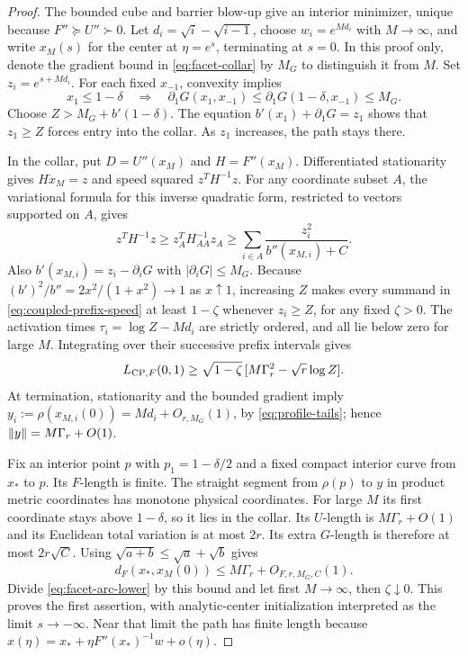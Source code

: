 \begin{proof}
The bounded cube and barrier blow-up give an interior minimizer,
unique because $F''\succeq U''\succ0$. Let
$d_i=\sqrt i-\sqrt{i-1}$, choose $w_i=e^{Md_i}$ with
$M\to\infty$, and write $x_M(s)$ for the center at $\eta=e^s$,
terminating at $s=0$. In this proof only, denote the gradient bound
in \eqref{eq:facet-collar} by $M_G$ to distinguish it from $M$.
Set $z_i=e^{s+Md_i}$. For each fixed $x_{-1}$, convexity implies
\[
 x_1\leq1-\delta\quad\Longrightarrow\quad
 \partial_1G(x_1,x_{-1})\leq
 \partial_1G(1-\delta,x_{-1})\leq M_G.
\]
Choose $Z>M_G+b'(1-\delta)$. The equation
$b'(x_1)+\partial_1G=z_1$ shows that $z_1\geq Z$ forces entry
into the collar. As $z_1$ increases, the path stays there.

In the collar, put $D=U''(x_M)$ and $H=F''(x_M)$.
Differentiated stationarity gives $H\dot x_M=z$ and speed squared
$z^TH^{-1}z$. For any coordinate subset $A$, the variational
formula for this inverse quadratic form, restricted to vectors
supported on $A$, gives
\begin{equation}
 z^TH^{-1}z\geq z_A^TH_{AA}^{-1}z_A
 \geq\sum_{i\in A}\frac{z_i^2}{b''(x_{M,i})+C}.
 \label{eq:coupled-prefix-speed}
\end{equation}
Also $b'(x_{M,i})=z_i-\partial_iG$ with
$|\partial_iG|\leq M_G$. Because
$(b')^2/b''=2x^2/(1+x^2)\to1$ as $x\uparrow1$, increasing
$Z$ makes every summand in \eqref{eq:coupled-prefix-speed}
at least $1-\zeta$ whenever $z_i\geq Z$, for any fixed
$\zeta>0$. The activation times
$\tau_i=\log Z-Md_i$ are strictly ordered, and all lie below zero
for large $M$. Integrating over their successive prefix intervals gives
\begin{equation}
 L_{\mathrm{CP},F}(0,1)\geq
 \sqrt{1-\zeta}\,[M\Gamma_r^2-\sqrt r\log Z].
 \label{eq:facet-arc-lower}
\end{equation}
At termination, stationarity and the bounded gradient imply
$y_i:=\rho(x_{M,i}(0))=Md_i+O_{r,M_G}(1)$, by
\eqref{eq:profile-tails}; hence $\lVert y\rVert=M\Gamma_r+O(1)$.

Fix an interior point $p$ with $p_1=1-\delta/2$ and a fixed
compact interior curve from $x_*$ to $p$. Its $F$-length is finite.
The straight segment from $\rho(p)$ to $y$ in product metric
coordinates has monotone physical coordinates. For large $M$ its
first coordinate stays above $1-\delta$, so it lies in the collar.
Its $U$-length is $M\Gamma_r+O(1)$ and its Euclidean total
variation is at most $2r$. Its extra $G$-length is therefore at most
$2r\sqrt C$. Using $\sqrt{a+b}\leq\sqrt a+\sqrt b$ gives
\begin{equation}
 d_F(x_*,x_M(0))\leq M\Gamma_r+O_{F,r,M_G,C}(1).
 \label{eq:facet-distance-upper}
\end{equation}
Divide \eqref{eq:facet-arc-lower} by this bound and let first
$M\to\infty$, then $\zeta\downarrow0$. This proves the first
assertion, with analytic-center initialization interpreted as the
limit $s\to-\infty$. Near that limit the path has finite length
because $x(\eta)=x_*+\eta F''(x_*)^{-1}w+o(\eta)$.


\end{proof}
